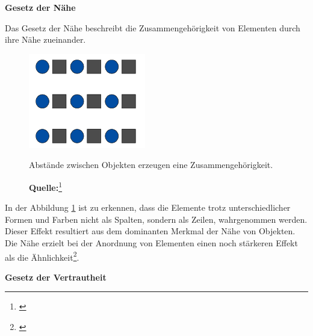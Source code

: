 \textbf{Gesetz der Nähe}

Das Gesetz der Nähe beschreibt die Zusammengehörigkeit von Elementen durch ihre Nähe zueinander.
\begin{figure}[H]
  \centering
  \includegraphics[scale=1]{img/gesetz_der_Naehe.PNG}
  \caption{Abstände zwischen Objekten erzeugen eine Zusammengehörigkeit.}
    \caption*{\textbf{Quelle:}\footnote{\cite{Dahm2006}}}
  \label{fig:naehe}
\end{figure}
In der Abbildung \ref{fig:naehe} ist zu erkennen, dass die Elemente trotz unterschiedlicher Formen und Farben  nicht als Spalten, sondern als Zeilen, wahrgenommen werden. Dieser Effekt resultiert aus dem dominanten Merkmal der Nähe von Objekten. Die Nähe erzielt bei der Anordnung von Elementen einen noch stärkeren Effekt als die Ähnlichkeit\footnote{\cite[vgl.][60]{Dahm2006}}.


\textbf{Gesetz der Vertrautheit}

